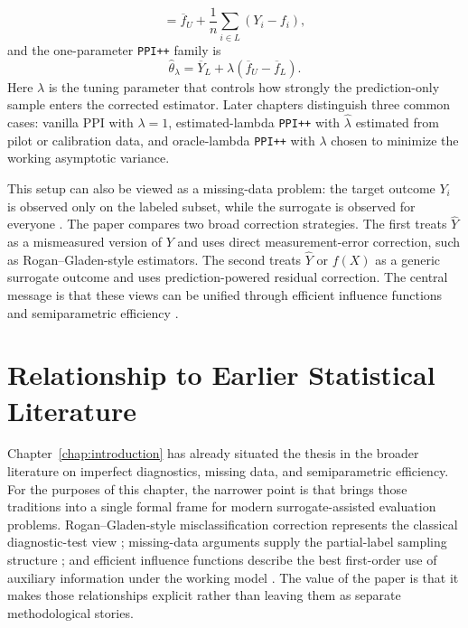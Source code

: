 \begin{itemize}
\begin{equation}
=
\overline{f}_{U}
+
\frac{1}{n}\sum_{i \in L}(Y_i-f_i),
\label{eq:ppi_mean}
\end{equation}
and the one-parameter \texttt{PPI++} family is
\begin{equation}
\widehat{\theta}_{\lambda}
=
\overline{Y}_{L}
+
\lambda(\overline{f}_{U}-\overline{f}_{L}).
\label{eq:ppi_pp_mean}
\end{equation}
    Here \(\lambda\) is the tuning parameter that controls how strongly the prediction-only sample enters the corrected estimator. Later chapters distinguish three common cases: vanilla PPI with \(\lambda = 1\), estimated-lambda \texttt{PPI++} with \(\hat{\lambda}\) estimated from pilot or calibration data, and oracle-lambda \texttt{PPI++} with \(\lambda\) chosen to minimize the working asymptotic variance.
\end{itemize}

This setup can also be viewed as a missing-data problem: the target outcome \(Y_i\) is observed only on the labeled subset, while the surrogate is observed for everyone \parencite{rubin1976, robins1995, tsiatis2006}. The paper compares two broad correction strategies. The first treats \(\widehat{Y}\) as a mismeasured version of \(Y\) and uses direct measurement-error correction, such as Rogan--Gladen-style estimators. The second treats \(\widehat{Y}\) or \(f(X)\) as a generic surrogate outcome and uses prediction-powered residual correction. The central message is that these views can be unified through efficient influence functions and semiparametric efficiency \parencite{rogan_gladen, eif_ref, tsiatis2006, llmjudge_eif}.

\section{Relationship to Earlier Statistical Literature}

Chapter~\ref{chap:introduction} has already situated the thesis in the broader literature on imperfect diagnostics, missing data, and semiparametric efficiency. For the purposes of this chapter, the narrower point is that \textcite{llmjudge_eif} brings those traditions into a single formal frame for modern surrogate-assisted evaluation problems. Rogan--Gladen-style misclassification correction represents the classical diagnostic-test view \parencite{rogan_gladen}; missing-data arguments supply the partial-label sampling structure \parencite{rubin1976, robins1995, tsiatis2006}; and efficient influence functions describe the best first-order use of auxiliary information under the working model \parencite{eif_ref, tsiatis2006}. The value of the paper is that it makes those relationships explicit rather than leaving them as separate methodological stories.

